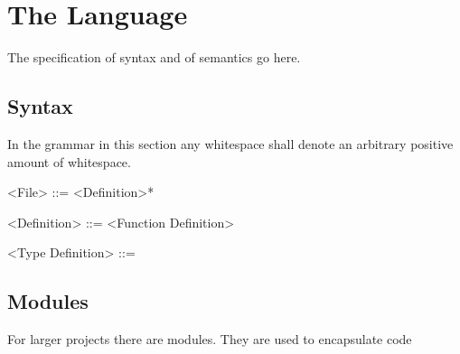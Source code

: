
\section{The Language}

The specification of syntax and of semantics go here.

\subsection{Syntax}

In the grammar in this section any whitespace shall denote an arbitrary positive amount of whitespace.

\begin{grammar}
	<File> ::= <Definition>*

	<Definition> ::= <Function Definition>
		\alt <Type Definition>

	<Type Definition> ::=
\end{grammar}

\subsection{Modules}

For larger projects there are modules. They are used to encapsulate code
